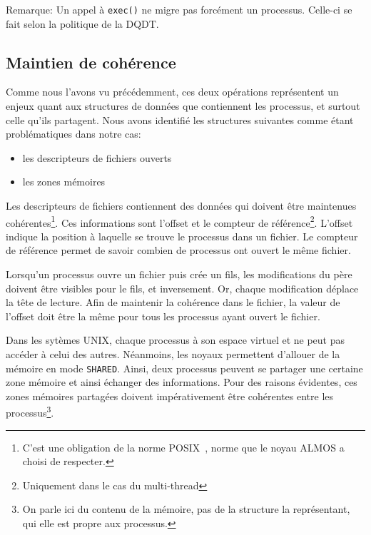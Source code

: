         \begin{paragraph}{Remarque:}
          Un appel à \texttt{exec()} ne migre pas forcément un
          processus. Celle-ci se fait selon la politique de la DQDT.
        \end{paragraph}


    \subsection{Maintien de cohérence}

      Comme nous l'avons vu précédemment, ces deux opérations représentent un
      enjeux quant aux structures de données que contiennent les processus, et
      surtout celle qu'ils partagent. Nous avons identifié les structures
      suivantes comme étant problématiques dans notre cas:
      \begin{itemize}
      \item les descripteurs de fichiers ouverts
      \item les zones mémoires
      \end{itemize}

      Les descripteurs de fichiers contiennent des données qui doivent être
      maintenues cohérentes\footnote{C'est une obligation de la norme
        POSIX~\citep{posix2013}, norme que le noyau ALMOS a choisi de
        respecter.}. Ces informations sont l'offset et le compteur de
      référence\footnote{Uniquement dans le cas du multi-thread}. L'offset
      indique la position à laquelle se trouve le processus dans un fichier. Le
      compteur de référence permet de savoir combien de processus ont ouvert le
      même fichier.

      Lorsqu'un processus ouvre un fichier puis crée un fils, les modifications
      du père doivent être visibles pour le fils, et inversement. Or, chaque
      modification déplace la tête de lecture. Afin de maintenir la cohérence
      dans le fichier, la valeur de l'offset doit être la même pour tous les
      processus ayant ouvert le fichier.

      Dans les sytèmes UNIX, chaque processus à son espace virtuel et ne peut
      pas accéder à celui des autres. Néanmoins, les noyaux permettent d'allouer
      de la mémoire en mode \texttt{SHARED}. Ainsi, deux processus peuvent se
      partager une certaine zone mémoire et ainsi échanger des
      informations. Pour des raisons évidentes, ces zones mémoires partagées
      doivent impérativement être cohérentes entre les processus\footnote{On
        parle ici du contenu de la mémoire, pas de la structure la représentant,
        qui elle est propre aux processus.}.

